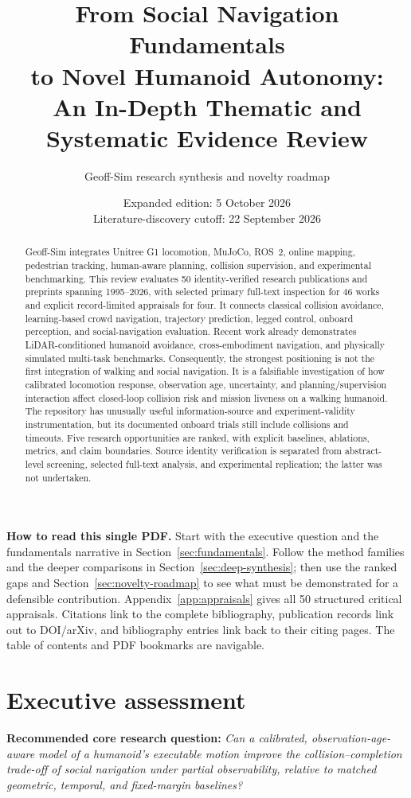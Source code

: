 \documentclass[11pt,a4paper]{article}
\title{From Social Navigation Fundamentals\\to Novel Humanoid Autonomy:\\An In-Depth Thematic and Systematic Evidence Review}
\author{Geoff-Sim research synthesis and novelty roadmap}
\date{Expanded edition: 5 October 2026\\Literature-discovery cutoff: 22 September 2026}
\begin{document}
\maketitle
\begin{abstract}
Geoff-Sim integrates Unitree G1 locomotion, MuJoCo, ROS~2, online mapping,
pedestrian tracking, human-aware planning, collision supervision, and experimental
benchmarking. This review evaluates 50 identity-verified research publications
and preprints spanning 1995--2026, with selected primary full-text inspection
for 46 works and explicit record-limited appraisals for four. It connects classical collision avoidance,
learning-based crowd navigation, trajectory prediction, legged control,
onboard perception, and social-navigation evaluation. Recent work already
demonstrates LiDAR-conditioned humanoid avoidance, cross-embodiment navigation,
and physically simulated multi-task benchmarks. Consequently, the strongest
positioning is not the first integration of walking and social navigation.
It is a falsifiable investigation of how calibrated locomotion response,
observation age, uncertainty, and planning/supervision interaction affect
closed-loop collision risk and mission liveness on a walking humanoid.
The repository has unusually useful information-source and experiment-validity
instrumentation, but its documented onboard trials still include collisions
and timeouts. Five research opportunities are ranked, with explicit baselines,
ablations, metrics, and claim boundaries. Source identity verification is
separated from abstract-level screening, selected full-text analysis, and
experimental replication; the latter was not undertaken.
\end{abstract}
\tableofcontents
\newpage

\noindent\textbf{How to read this single PDF.} Start with the executive question
and the fundamentals narrative in Section~\ref{sec:fundamentals}. Follow the
method families and the deeper comparisons in Section~\ref{sec:deep-synthesis};
then use the ranked gaps and Section~\ref{sec:novelty-roadmap} to see what must be
demonstrated for a defensible contribution. Appendix~\ref{app:appraisals} gives
all 50 structured critical appraisals. Citations link to the complete bibliography,
publication records link out to DOI/arXiv, and bibliography entries link back
to their citing pages. The table of contents and PDF bookmarks are navigable.

\section{Executive assessment}
\label{sec:executive}
\textbf{Recommended core research question:}
\emph{Can a calibrated, observation-age-aware model of a humanoid's executable
motion improve the collision--completion trade-off of social navigation under
partial observability, relative to matched geometric, temporal, and fixed-margin
baselines?}
\end{document}
